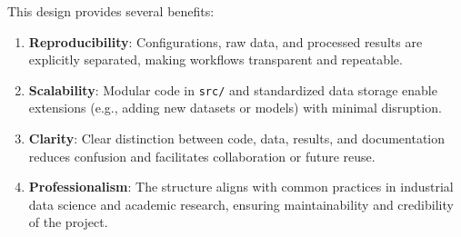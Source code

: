 \noindent This design provides several benefits:
\begin{enumerate}
    \item \textbf{Reproducibility}: Configurations, raw data, and processed results are explicitly separated, making workflows transparent and repeatable.
    \item \textbf{Scalability}: Modular code in \texttt{src/} and standardized data storage enable extensions (e.g., adding new datasets or models) with minimal disruption.
    \item \textbf{Clarity}: Clear distinction between code, data, results, and documentation reduces confusion and facilitates collaboration or future reuse.
    \item \textbf{Professionalism}: The structure aligns with common practices in industrial data science and academic research, ensuring maintainability and credibility of the project.
\end{enumerate}

